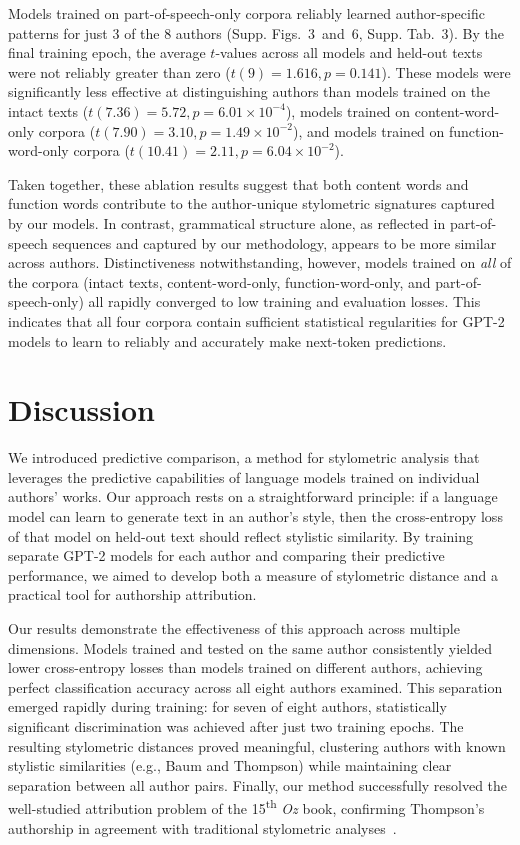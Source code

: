 \documentclass[11pt]{article}
\newcommand{\crossentropyPOS}{{3}}
\newcommand{\ttestsPOS}{{6}}
\newcommand{\authortablePOS}{{3}}
\begin{document}
Models trained on part-of-speech-only corpora reliably learned author-specific
patterns for just 3 of the 8 authors (Supp.
Figs.~\crossentropyPOS~and~\ttestsPOS, Supp. Tab.~\authortablePOS). By the
final training epoch, the average $t$-values across all models and held-out
texts were not reliably greater than zero ($t(9) = 1.616, p = 0.141$). These
models were significantly less effective at distinguishing authors than models
trained on the intact texts ($t(7.36) = 5.72, p = 6.01 \times 10^{-4}$), models
trained on content-word-only corpora ($t(7.90) = 3.10, p = 1.49 \times
10^{-2}$), and models trained on function-word-only corpora ($t(10.41) = 2.11,
p = 6.04 \times 10^{-2}$).

Taken together, these ablation results suggest that both content words and
function words contribute to the author-unique stylometric signatures captured
by our models. In contrast, grammatical structure alone, as reflected in
part-of-speech sequences and captured by our methodology, appears to be more
similar across authors. Distinctiveness notwithstanding, however, models
trained on \textit{all} of the corpora (intact texts, content-word-only,
function-word-only, and part-of-speech-only) all rapidly converged to low
training and evaluation losses. This indicates that all four corpora contain
sufficient statistical regularities for GPT-2 models to learn to reliably
and accurately make next-token predictions.

\section{Discussion}

We introduced predictive comparison, a method for stylometric analysis that
leverages the predictive capabilities of language models trained on individual
authors' works. Our approach rests on a straightforward principle: if a
language model can learn to generate text in an author's style, then the
cross-entropy loss of that model on held-out text should reflect stylistic
similarity. By training separate GPT-2 models for each author and comparing
their predictive performance, we aimed to develop both a measure of stylometric
distance and a practical tool for authorship attribution.

Our results demonstrate the effectiveness of this approach across multiple
dimensions. Models trained and tested on the same author consistently yielded
lower cross-entropy losses than models trained on different authors, achieving
perfect classification accuracy across all eight authors examined. This
separation emerged rapidly during training: for seven of eight authors,
statistically significant discrimination was achieved after just two training
epochs. The resulting stylometric distances proved meaningful, clustering
authors with known stylistic similarities (e.g., Baum and Thompson) while
maintaining clear separation between all author pairs. Finally, our method
successfully resolved the well-studied attribution problem of the
15\textsuperscript{th} \emph{Oz} book, confirming Thompson's authorship in
agreement with traditional stylometric analyses~\citep{NiloBino03}.
\end{document}
